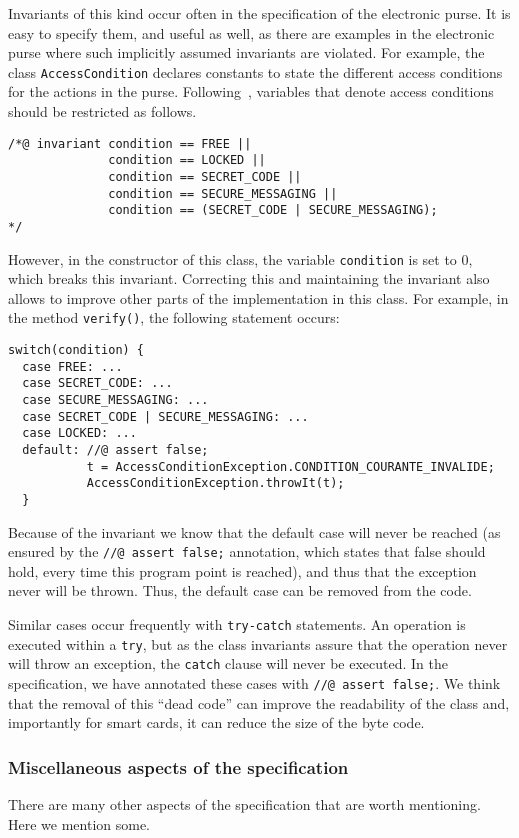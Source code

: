 \documentclass[a4paper]{llncs}
\begin{document}
Invariants of this kind occur often in the specification of the
electronic purse. It is easy to specify them, and useful as well, as
there are examples in the electronic purse where such implicitly assumed
invariants are violated.
For example, the class \texttt{AccessCondition} declares constants to
state the different access conditions for the actions in the
purse. Following~\cite{BretagneMGL00}, variables that denote access conditions
should be restricted as follows.
\begin{verbatim}
/*@ invariant condition == FREE ||
              condition == LOCKED ||
              condition == SECRET_CODE ||
              condition == SECURE_MESSAGING ||
              condition == (SECRET_CODE | SECURE_MESSAGING);
*/
\end{verbatim}

However, in the constructor of this class, the variable
\texttt{condition} is set to 0, which breaks this
invariant. Correcting this and maintaining the invariant also allows
to improve other parts of the implementation in this class. For
example, in the method \texttt{verify()}, the following statement
occurs:
\begin{verbatim}
switch(condition) {
  case FREE: ...
  case SECRET_CODE: ...
  case SECURE_MESSAGING: ...
  case SECRET_CODE | SECURE_MESSAGING: ...
  case LOCKED: ...
  default: //@ assert false;
           t = AccessConditionException.CONDITION_COURANTE_INVALIDE;
           AccessConditionException.throwIt(t);
  }
\end{verbatim}
Because of the invariant we know that the default case will never
be reached (as ensured by the \texttt{//@ assert false;} annotation,
which states that false should hold, every time this program point is
reached), and thus that the exception never will be thrown. Thus, the
default case can be removed from the code.

Similar cases occur frequently with \texttt{try-catch} statements. An
operation is executed within a \texttt{try}, but as the class invariants
assure that the operation never will throw an exception, the
\texttt{catch} clause will never be executed. In the specification, we 
have annotated these cases with \texttt{//@ assert false;}. We think
that the removal of this ``dead code'' can improve the readability of
the class and, importantly for smart cards, it can reduce the 
size of the byte code.


\subsubsection{Miscellaneous aspects of the specification}
There are many other aspects of the specification that are worth
mentioning. Here we mention some.
\end{document}
